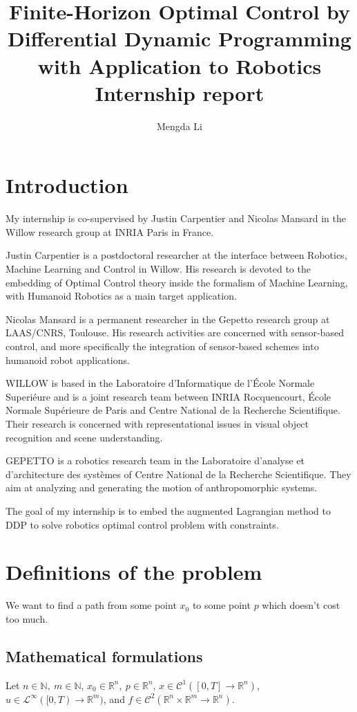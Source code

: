 \documentclass{report}
\title{Finite-Horizon Optimal Control by Differential Dynamic Programming with Application to Robotics 	\\
\medskip
\large Internship report
}
\author{Mengda Li }
\begin{document}
\maketitle
\tableofcontents

\chapter*{Introduction}

My internship is co-supervised by Justin Carpentier and Nicolas Mansard in the Willow research group at INRIA Paris in France. 

Justin Carpentier is a postdoctoral researcher at the interface between Robotics, Machine Learning and Control in Willow. His research is devoted to the embedding of Optimal Control theory inside the formalism of Machine Learning, with Humanoid Robotics as a main target application.  

Nicolas Mansard is a permanent researcher in the Gepetto research group at LAAS/CNRS, Toulouse. His research activities are concerned with sensor-based control, and more specifically the integration of sensor-based schemes into humanoid robot applications. 

WILLOW is based in the Laboratoire d'Informatique de l'École Normale Superiéure and is a joint research team between INRIA Rocquencourt, École Normale Supérieure de Paris and Centre National de la Recherche Scientifique. 
Their research is concerned with representational issues in visual object recognition and scene understanding. 

GEPETTO is a robotics research team in the Laboratoire d'analyse et d'architecture des systèmes of Centre National de la Recherche Scientifique. They aim at analyzing and generating the motion of anthropomorphic systems. 

The goal of my internship is to embed the augmented Lagrangian method to DDP to solve robotics optimal control problem with constraints. 
\chapter{Definitions of the problem}
We want to find a path from some point $x_0$ to some point $p$ which doesn't cost too much.

\section{Mathematical formulations}
Let $n\in \mathbb{N}, \ m \in \mathbb{N}$, $x_0\in \mathbb{R}^n, \ p \in \mathbb{R}^n$, $x \in \mathscr{C}^1([0, T] \to \mathbb{R}^n)$, $u \in \mathscr{L}^\infty([0, T) \to \mathbb{R}^m)$, and $f \in  \mathscr{C}^2(\mathbb{R}^n \times \mathbb{R}^m \to \mathbb{R}^n)$. 
\end{document}
